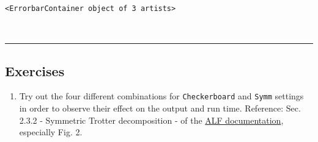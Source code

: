             \begin{tcolorbox}[breakable, size=fbox, boxrule=.5pt, pad at break*=1mm, opacityfill=0]
\begin{Verbatim}[commandchars=\\\{\}]
<ErrorbarContainer object of 3 artists>
\end{Verbatim}
\end{tcolorbox}
        
    \begin{center}
    \end{center}
    { \hspace*{\fill} \\}
    
    \begin{center}\rule{0.5\linewidth}{0.5pt}\end{center}

\hypertarget{exercises}{%
\subsection{Exercises}\label{exercises}}

\begin{enumerate}
\def\labelenumi{\arabic{enumi}.}
\tightlist
\item
  Try out the four different combinations for \texttt{Checkerboard} and
  \texttt{Symm} settings in order to observe their effect on the output
  and run time. Reference: Sec. 2.3.2 - Symmetric Trotter decomposition
  - of the
  \href{https://git.physik.uni-wuerzburg.de/ALF/ALF/-/blob/ALF-2.2/Documentation/doc.pdf}{ALF
  documentation}, especially Fig. 2.
\end{enumerate}


    
    
    
